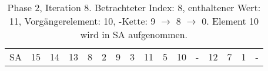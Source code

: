 \begin{table}[H]
\begin{adjustbox}{max width=\textwidth}
\begin{tabular}{lccccccccccccccc}
\multicolumn{1}{l|}{SA}      & \multicolumn{1}{c|}{15} & 14 & \multicolumn{1}{c|}{13} & \multicolumn{1}{c|}{8}     & \multicolumn{1}{c|}{2}      & \multicolumn{1}{c|}{9}    & \multicolumn{1}{c|}{3}     & \multicolumn{1}{c|}{\cellcolor[HTML]{\green}11} & \multicolumn{1}{c|}{5}   & \cellcolor[HTML]{\red}10 & \multicolumn{1}{c|}{-}  & 12  & 7   & 1   & -  
\end{tabular}
\end{adjustbox}

\caption[Phase 2, Iteration 8]{Phase 2, Iteration 8. Betrachteter Index: 8, enthaltener Wert: 11, Vorgängerelement: 10, \prevpointer-Kette: 9 $\rightarrow$ 8 $\rightarrow$ 0. Element 10 wird in SA aufgenommen.}
\label{table_complex_example_2_8} 
\end{table}


